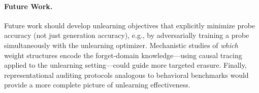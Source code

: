 \paragraph{Future Work.}
Future work should develop unlearning objectives that explicitly minimize probe
accuracy (not just generation accuracy), e.g., by adversarially training a probe
simultaneously with the unlearning optimizer.
Mechanistic studies of \emph{which} weight structures encode the forget-domain
knowledge---using causal tracing~\citep{meng2022locating} applied to the unlearning
setting---could guide more targeted erasure.
Finally, representational auditing protocols analogous to behavioral benchmarks
would provide a more complete picture of unlearning effectiveness.
